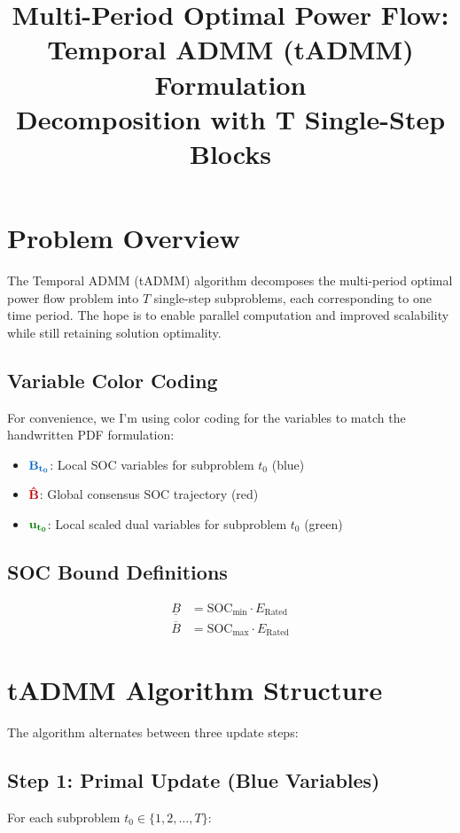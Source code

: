 \documentclass[11pt]{article}
\title{Multi-Period Optimal Power Flow:\\Temporal ADMM (tADMM) Formulation\\[0.5em] \large Decomposition with T Single-Step Blocks}
\author{}
\date{}
\newcommand{\blueB}[1]{\textcolor{bluevar}{\mathbf{#1}}}      %
\newcommand{\redBhat}[1]{\textcolor{redvar}{\mathbf{#1}}}     %
\newcommand{\greenu}[1]{\textcolor{greenvar}{\mathbf{#1}}}    %
\begin{document}
\maketitle

\section{Problem Overview}

The Temporal ADMM (tADMM) algorithm decomposes the multi-period optimal power flow problem into $T$ single-step subproblems, each corresponding to one time period. The hope is to enable parallel computation and improved scalability while still retaining solution optimality.

\subsection{Variable Color Coding}
For convenience, we I'm using color coding for the variables to match the handwritten PDF formulation:
\begin{itemize}
    \item $\blueB{B_{t_0}}$: Local SOC variables for subproblem $t_0$ (blue)
    \item $\redBhat{\hat{B}}$: Global consensus SOC trajectory (red)
    \item $\greenu{u_{t_0}}$: Local scaled dual variables for subproblem $t_0$ (green)
\end{itemize}

\subsection{SOC Bound Definitions}
\begin{align}
\underline{B} &= \text{SOC}_{\min} \cdot E_{\text{Rated}} \\
\overline{B} &= \text{SOC}_{\max} \cdot E_{\text{Rated}}
\end{align}

\section{tADMM Algorithm Structure}

The algorithm alternates between three update steps:

\subsection{Step 1: Primal Update (Blue Variables)}
For each subproblem $t_0 \in \{1, 2, \ldots, T\}$:
\end{document}

